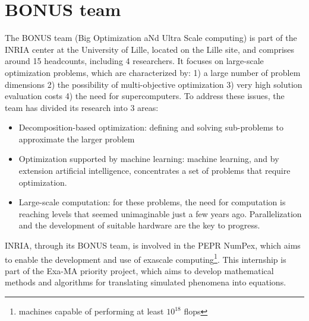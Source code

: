 \section{BONUS team}

The BONUS team (Big Optimization aNd Ultra Scale computing) is part of the INRIA center at the University of Lille, located on the Lille site, and comprises around 15 headcounts, including 4 researchers. It focuses on large-scale optimization problems, which are characterized by: 1) a large number of problem dimensions 2) the possibility of multi-objective optimization 3) very high solution evaluation costs 4) the need for supercomputers.
To address these issues, the team has divided its research into 3 areas:
\begin{itemize}
  \item Decomposition-based optimization: defining and solving sub-problems to approximate the larger problem
    \item Optimization supported by machine learning: machine learning, and by extension artificial intelligence, concentrates a set of problems that require optimization.
    \item Large-scale computation: for these problems, the need for computation is reaching levels that seemed unimaginable just a few years ago. Parallelization and the development of suitable hardware are the key to progress.
\end{itemize}

INRIA, through its BONUS team, is involved in the PEPR NumPex\cite{numpex}, which aims to enable the development and use of exascale computing\footnote{machines capable of performing at least $10^{18}$ \acrshort{flops}}. This internship is part of the Exa-MA priority project, which aims to develop mathematical methods and algorithms for translating simulated phenomena into equations.
